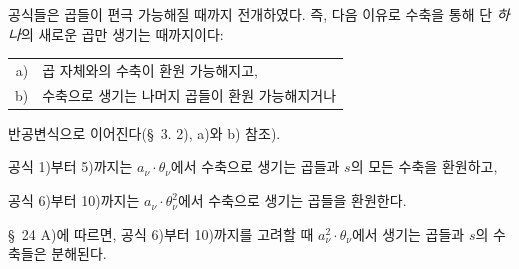 
공식들은 곱들이 편극 가능해질 때까지 전개하였다. 즉, 다음 이유로 수축을 통해 단 \emph{하나}의 새로운 곱만 생기는 때까지이다:
\begin{center}
\begin{tabular}{rl}
a)&곱 자체와의 수축이 환원 가능해지고,\\
b)&수축으로 생기는 나머지 곱들이 환원 가능해지거나
\end{tabular}
\end{center}
반공변식으로 이어진다(\S\ 3. 2), a)와 b) 참조).

공식 1)부터 5)까지는 $a_\nu\cdot\theta_\nu$에서 수축으로 생기는 곱들과 $s$의 모든 수축을 환원하고,

공식 6)부터 10)까지는 $a_\nu\cdot\theta_\nu^2$에서 수축으로 생기는 곱들을 환원한다.

\S\ 24 A)에 따르면, 공식 6)부터 10)까지를 고려할 때 $a_\nu^2\cdot\theta_\nu$에서 생기는 곱들과 $s$의 수축들은 분해된다.
